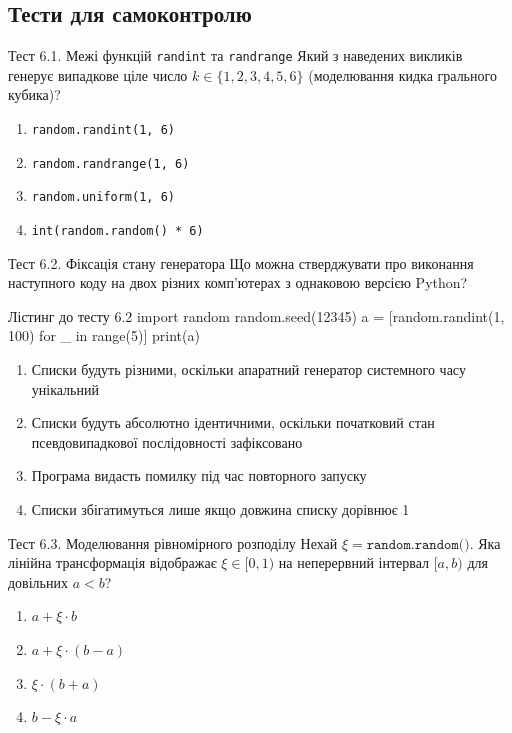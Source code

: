 \subsection*{Тести для самоконтролю}

\begin{pr}{Тест 6.1. Межі функцій \texttt{randint} та \texttt{randrange}}
Який з наведених викликів генерує випадкове ціле число $k \in \{1, 2, 3, 4, 5, 6\}$ (моделювання кидка грального кубика)?
\begin{enumerate}[label=\textbf{\Alph*.}]
	\item \texttt{random.randint(1, 6)}
	\item \texttt{random.randrange(1, 6)}
	\item \texttt{random.uniform(1, 6)}
	\item \texttt{int(random.random() * 6)}
\end{enumerate}
\end{pr}

\begin{pr}{Тест 6.2. Фіксація стану генератора}
Що можна стверджувати про виконання наступного коду на двох різних комп'ютерах з однаковою версією Python?
\begin{py}{Лістинг до тесту 6.2}
import random
random.seed(12345)
a = [random.randint(1, 100) for _ in range(5)]
print(a)
\end{py}
\begin{enumerate}[label=\textbf{\Alph*.}]
	\item Списки будуть різними, оскільки апаратний генератор системного часу унікальний
	\item Списки будуть абсолютно ідентичними, оскільки початковий стан псевдовипадкової послідовності зафіксовано
	\item Програма видасть помилку під час повторного запуску
	\item Списки збігатимуться лише якщо довжина списку дорівнює 1
\end{enumerate}
\end{pr}

\begin{pr}{Тест 6.3. Моделювання рівномірного розподілу}
Нехай $\xi = \texttt{random.random()}$. Яка лінійна трансформація відображає $\xi \in [0, 1)$ на неперервний інтервал $[a, b)$ для довільних $a < b$?
\begin{enumerate}[label=\textbf{\Alph*.}]
	\item $a + \xi \cdot b$
	\item $a + \xi \cdot (b - a)$
	\item $\xi \cdot (b + a)$
	\item $b - \xi \cdot a$
\end{enumerate}
\end{pr}

